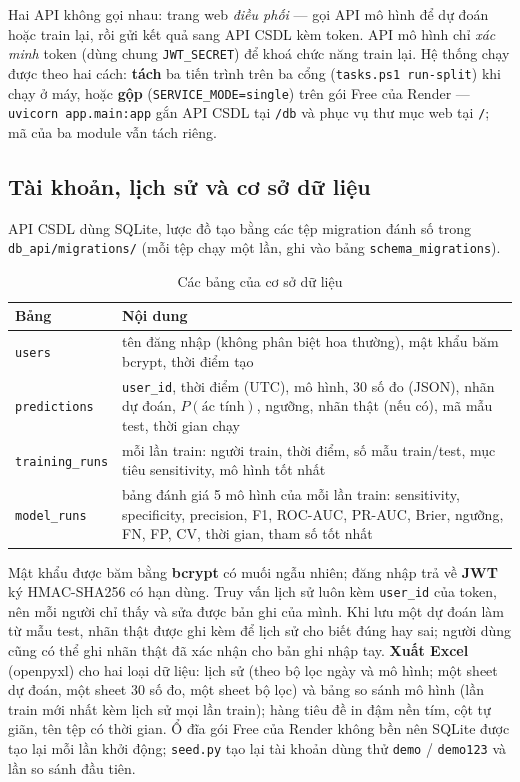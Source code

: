 \documentclass[12pt]{article}
\begin{document}
Hai API không gọi nhau: trang web \emph{điều phối} --- gọi API mô hình để dự đoán hoặc train lại, rồi gửi kết quả sang
API CSDL kèm token. API mô hình chỉ \emph{xác minh} token (dùng chung \texttt{JWT\_SECRET}) để khoá chức năng train lại.
Hệ thống chạy được theo hai cách: \textbf{tách} ba tiến trình trên ba cổng (\texttt{tasks.ps1 run-split}) khi chạy ở
máy, hoặc \textbf{gộp} (\texttt{SERVICE\_MODE=single}) trên gói Free của Render --- \texttt{uvicorn app.main:app} gắn API
CSDL tại \texttt{/db} và phục vụ thư mục web tại \texttt{/}; mã của ba module vẫn tách riêng.

\subsection{Tài khoản, lịch sử và cơ sở dữ liệu}
API CSDL dùng SQLite, lược đồ tạo bằng các tệp migration đánh số trong \texttt{db\_api/migrations/} (mỗi tệp chạy một lần,
ghi vào bảng \texttt{schema\_migrations}).

\begin{table}[H]
\centering
\caption{Các bảng của cơ sở dữ liệu}
\small
\begin{tabular}{@{}lp{}@{}}
\toprule
Bảng & Nội dung \\
\midrule
\texttt{users} & tên đăng nhập (không phân biệt hoa thường), mật khẩu băm bcrypt, thời điểm tạo \\
\texttt{predictions} & \texttt{user\_id}, thời điểm (UTC), mô hình, 30 số đo (JSON), nhãn dự đoán, $P(\text{ác tính})$,
                       ngưỡng, nhãn thật (nếu có), mã mẫu test, thời gian chạy \\
\texttt{training\_runs} & mỗi lần train: người train, thời điểm, số mẫu train/test, mục tiêu sensitivity, mô hình tốt nhất \\
\texttt{model\_runs} & bảng đánh giá 5 mô hình của mỗi lần train: sensitivity, specificity, precision, F1, ROC-AUC, PR-AUC,
                       Brier, ngưỡng, FN, FP, CV, thời gian, tham số tốt nhất \\
\bottomrule
\end{tabular}
\end{table}

Mật khẩu được băm bằng \textbf{bcrypt} có muối ngẫu nhiên; đăng nhập trả về \textbf{JWT} ký HMAC-SHA256 có hạn dùng. Truy
vấn lịch sử luôn kèm \texttt{user\_id} của token, nên mỗi người chỉ thấy và sửa được bản ghi của mình. Khi lưu một dự
đoán làm từ mẫu test, nhãn thật được ghi kèm để lịch sử cho biết đúng hay sai; người dùng cũng có thể ghi nhãn thật đã
xác nhận cho bản ghi nhập tay. \textbf{Xuất Excel} (openpyxl) cho hai loại dữ liệu: lịch sử (theo bộ lọc ngày và mô hình;
một sheet dự đoán, một sheet 30 số đo, một sheet bộ lọc) và bảng so sánh mô hình (lần train mới nhất kèm lịch sử mọi lần
train); hàng tiêu đề in đậm nền tím, cột tự giãn, tên tệp có thời gian. Ổ đĩa gói Free của Render không bền nên SQLite
được tạo lại mỗi lần khởi động; \texttt{seed.py} tạo lại tài khoản dùng thử \texttt{demo} / \texttt{demo123} và lần so
sánh đầu tiên.
\end{document}
